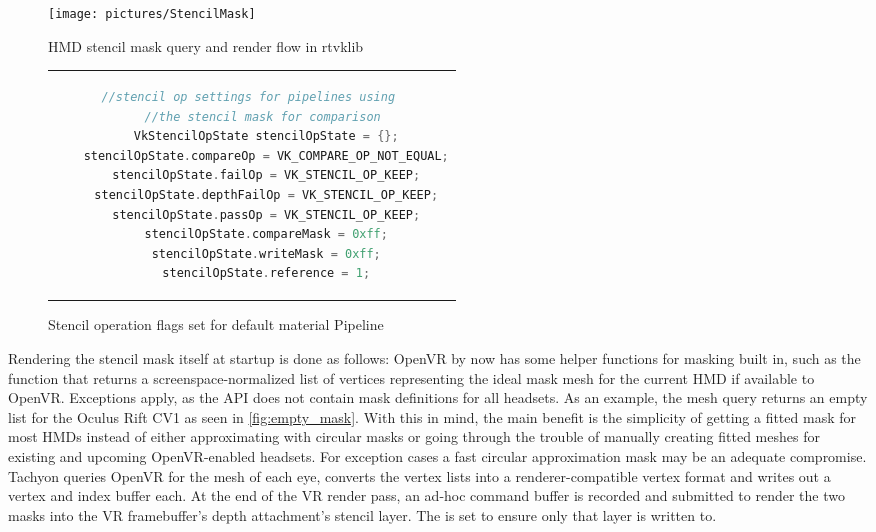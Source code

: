 \begin{figure}[htb]
  \centering
  \texttt{[image: pictures/StencilMask]}
  \caption{HMD stencil mask query and render flow in \gls{rtvklib}} \label{fig:StencilMask}
\end{figure}

\begin{figure}[htb]
  \centering
  \begin{tabular}{c}
  \begin{lstlisting}[language=C++]
	//stencil op settings for pipelines using 
	//the stencil mask for comparison 
	VkStencilOpState stencilOpState = {};
	stencilOpState.compareOp = VK_COMPARE_OP_NOT_EQUAL;
	stencilOpState.failOp = VK_STENCIL_OP_KEEP;
	stencilOpState.depthFailOp = VK_STENCIL_OP_KEEP;
	stencilOpState.passOp = VK_STENCIL_OP_KEEP;
	stencilOpState.compareMask = 0xff;
	stencilOpState.writeMask = 0xff;
	stencilOpState.reference = 1;
	\end{lstlisting}
  \end{tabular}
  \caption[Material pipeline stencil operation flags]{Stencil operation flags set for default material Pipeline}\label{fig:lst_StencilOpState_MaterialPipeline}
\end{figure}

Rendering the stencil mask itself at startup is done as follows: 
OpenVR by now has some helper functions for masking built in, such as the  function that returns a screenspace-normalized list of vertices representing the ideal mask mesh for the current HMD if available to OpenVR. Exceptions apply, as the API does not contain mask definitions for all headsets. As an example, the mesh query returns an empty list for the Oculus Rift CV1 as seen in \autoref{fig:empty_mask}. With this in mind, the main benefit is the simplicity of getting a fitted mask for most HMDs instead of either approximating with circular masks or going through the trouble of manually creating fitted meshes for existing and upcoming OpenVR-enabled headsets. For exception cases a fast circular approximation mask may be an adequate compromise. \\
\gls{Tachyon} queries OpenVR for the mesh of each eye, converts the vertex lists into a renderer-compatible vertex format and writes out a vertex and index buffer each. 
At the end of the \gls{VR} render pass, an ad-hoc command buffer is recorded and submitted to render the two masks into the \gls{VR} framebuffer's depth attachment's stencil layer. The  is set to ensure only that layer is written to. 

